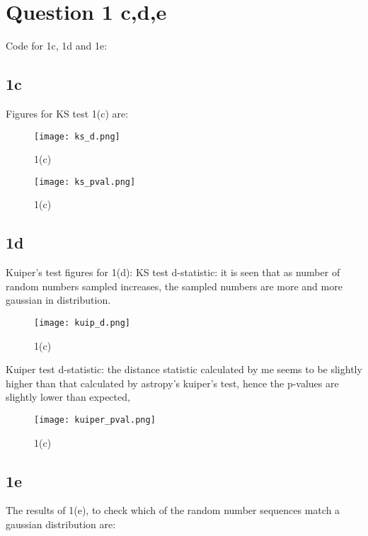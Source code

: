 \section{Question 1 c,d,e}

Code for 1c, 1d and 1e:


\subsection{1c}

Figures for KS test 1(c) are:
\begin{figure}[H]
  \centering
  \texttt{[image: ks\_d.png]}
  \caption{1(c)}
  \label{fig:fig1}
\end{figure}

\begin{figure}[H]
  \centering
  \texttt{[image: ks\_pval.png]}
  \caption{1(c)}
  \label{fig:fig1}
\end{figure}

\subsection{1d}

Kuiper's test figures for 1(d):
KS test d-statistic: it is seen that as number of random numbers sampled increases, the sampled numbers are more and more gaussian in distribution.

\begin{figure}[H]
  \centering
  \texttt{[image: kuip\_d.png]}
  \caption{1(c)}
  \label{fig:fig1}
\end{figure}

Kuiper test d-statistic: the distance statistic calculated by me seems to be slightly higher than that calculated by astropy's kuiper's test, hence the p-values are slightly lower than expected,

\begin{figure}[H]
  \centering
  \texttt{[image: kuiper\_pval.png]}
  \caption{1(c)}
  \label{fig:fig1}
\end{figure}
\subsection{1e}

The results of 1(e), to check which of the random number sequences match a gaussian distribution are:

